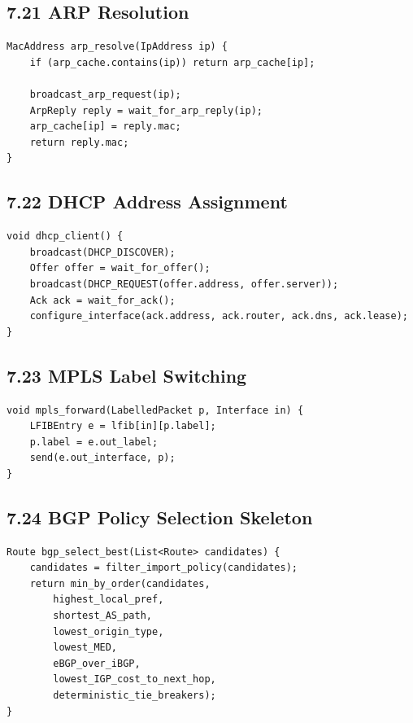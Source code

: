 \documentclass[11pt]{article}
\begin{document}
\subsection{7.21 ARP Resolution}\label{arp-resolution}

\begin{verbatim}
MacAddress arp_resolve(IpAddress ip) {
    if (arp_cache.contains(ip)) return arp_cache[ip];

    broadcast_arp_request(ip);
    ArpReply reply = wait_for_arp_reply(ip);
    arp_cache[ip] = reply.mac;
    return reply.mac;
}
\end{verbatim}

\subsection{7.22 DHCP Address Assignment}\label{dhcp-address-assignment}

\begin{verbatim}
void dhcp_client() {
    broadcast(DHCP_DISCOVER);
    Offer offer = wait_for_offer();
    broadcast(DHCP_REQUEST(offer.address, offer.server));
    Ack ack = wait_for_ack();
    configure_interface(ack.address, ack.router, ack.dns, ack.lease);
}
\end{verbatim}

\subsection{7.23 MPLS Label Switching}\label{mpls-label-switching}

\begin{verbatim}
void mpls_forward(LabelledPacket p, Interface in) {
    LFIBEntry e = lfib[in][p.label];
    p.label = e.out_label;
    send(e.out_interface, p);
}
\end{verbatim}

\subsection{7.24 BGP Policy Selection
Skeleton}\label{bgp-policy-selection-skeleton}

\begin{verbatim}
Route bgp_select_best(List<Route> candidates) {
    candidates = filter_import_policy(candidates);
    return min_by_order(candidates,
        highest_local_pref,
        shortest_AS_path,
        lowest_origin_type,
        lowest_MED,
        eBGP_over_iBGP,
        lowest_IGP_cost_to_next_hop,
        deterministic_tie_breakers);
}
\end{verbatim}
\end{document}
